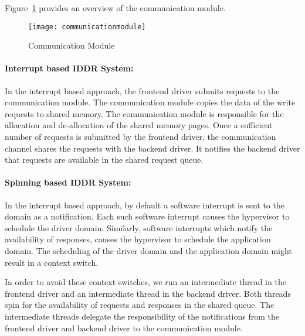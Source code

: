 Figure~\ref{fig:communication} provides an overview of the communication module. 
\begin{figure}[!ht]
\centering
\texttt{[image: communicationmodule]}
\caption{Communication Module}
\label{fig:communication}
\end{figure}

\paragraph{Interrupt based IDDR System:}
\label{par:base IDDR communication}
In the interrupt based approach, the frontend driver submits requests
to the communication module. The communication module copies the data of
the write requests to shared memory. The communication module is
responsible for the allocation and de-allocation of the shared memory
pages. Once a sufficient number of requests is submitted by the frontend
driver, the communication channel shares the requests with the backend
driver. It notifies the backend driver that requests are available in
the shared request queue.

\paragraph{Spinning based IDDR System:}
\label{par:spin IDDR communication} In the interrupt based approach, by
default a software interrupt is sent to the domain as a notification. Each
such software interrupt causes the hypervisor to schedule the driver
domain. Similarly, software interrupts which notify the availability of
responses, causes the hypervisor to schedule the application domain. The
scheduling of the driver domain and the application domain might result
in a context switch.

In order to avoid these context switches, we run an intermediate
thread in the frontend driver and an intermediate thread in the backend
driver. Both threads spin for the availability of requests and responses
in the shared queue. The intermediate threads delegate the responsibility
of the notifications from the frontend driver and backend driver to the
communication module.
